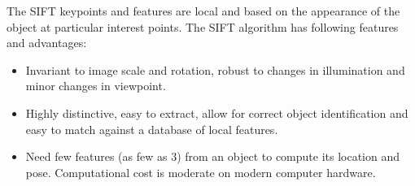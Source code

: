 The SIFT keypoints and features are local and based on the appearance
of the object at particular interest points. The SIFT algorithm has following
features and advantages:
\begin{itemize}
\item Invariant to image scale and rotation, robust to changes in
  illumination and minor changes in viewpoint.
\item Highly distinctive, easy to extract, allow for correct object
  identification and easy to match against a database of local
  features. 
\item Need few features (as few as 3) from an object to compute its location
  and pose. Computational cost is moderate on modern computer hardware.
\end{itemize}


